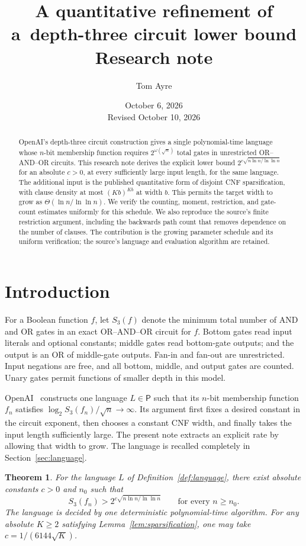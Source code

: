 \documentclass[11pt,letterpaper]{article}
\title{A quantitative refinement of a\ depth-three circuit lower bound\\[0.5em]\large Research note}
\author{Tom Ayre}
\date{October 6, 2026\\Revised October 10, 2026}
\newtheorem{theorem}{Theorem}[section]
\theoremstyle{definition}
\numberwithin{equation}{section}
\begin{document}
\maketitle
\begin{abstract}
OpenAI's depth-three circuit construction gives a single polynomial-time
language whose $n$-bit membership function requires
$2^{\omega(\sqrt n)}$ total gates in unrestricted OR--AND--OR circuits.
This research note derives the explicit lower bound
$2^{c\sqrt{n\ln n/\ln\ln n}}$ for an absolute $c>0$, at every sufficiently
large input length, for the same language. The additional input is the
published quantitative form of disjoint CNF sparsification, with clause
density at most $(Kb)^{Kb}$ at width $b$. This permits the target width to
grow as $\Theta(\ln n/\ln\ln n)$. We verify the counting, moment, restriction,
and gate-count estimates uniformly for this schedule. We also reproduce
the source's finite restriction argument, including the backwards path
count that removes dependence on the number of clauses. The contribution
is the growing parameter schedule and its uniform verification; the source's
language and evaluation algorithm are retained.
\end{abstract}

\section{Introduction}
For a Boolean function $f$, let $S_3(f)$ denote the minimum total number
of AND and OR gates in an exact OR--AND--OR circuit for $f$. Bottom gates
read input literals and optional constants; middle gates read bottom-gate
outputs; and the output is an OR of middle-gate outputs. Fan-in and
fan-out are unrestricted. Input negations are free, and all bottom,
middle, and output gates are counted. Unary gates permit functions of
smaller depth in this model.

OpenAI~\cite{OAI26} constructs one language $L\in\mathsf P$ such that its
$n$-bit membership function $f_n$ satisfies
$\log_2 S_3(f_n)/\sqrt n\to\infty$. Its argument first fixes a desired
constant in the circuit exponent, then chooses a constant CNF width, and
finally takes the input length sufficiently large. The present note
extracts an explicit rate by allowing that width to grow. The language is
recalled completely in Section~\ref{sec:language}.

\begin{theorem}\label{thm:main}
For the language $L$ of Definition~\ref{def:language}, there exist absolute
constants $c>0$ and $n_0$ such that
\begin{equation}\label{eq:main}
 S_3(f_n)>2^{c\sqrt{n\ln n/\ln\ln n}}
 \qquad\text{for every }n\ge n_0.
\end{equation}
The language is decided by one deterministic polynomial-time algorithm.
For any absolute $K\ge2$ satisfying Lemma~\ref{lem:sparsification},
one may take $c=1/(6144\sqrt K)$.
\end{theorem}
\end{document}
